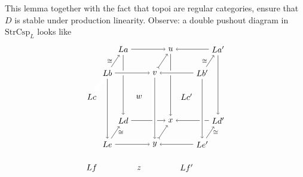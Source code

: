\documentclass{amsart}
\newcommand{\iso}{\cong}
\newcommand{\StrCsp}{\cat{StrCsp}}
\newcommand{\cat}[1]{\mathrm{#1}}
\theoremstyle{remark}
\theoremstyle{definition}
\begin{document}
This lemma together with the fact that topoi are regular
categories, ensure that $ D $ is stable under production linearity.
Observe: a double pushout diagram in $ \StrCsp_{L} $ looks like
%
\[
  \begin{tikzpicture}
    \node (1) at (1.33,5) {\( La \)};
    \node (2) at (3.33,5) {\( u \)};
    \node (3) at (5.33,5) {\( La' \)};
    \node (4) at (0.66,4) {\( Lb \)};
    \node (5) at (2.66,4) {\( v \)};
    \node (6) at (4.66,4) {\( Lb' \)};
    \node (7) at (0,3) {\( Lc \)};
    \node (8) at (2,3) {\( w \)};
    \node (9) at (4,3) {\( Lc' \)};
    \node (1') at (1.33,2) {\( Ld \)};
    \node (2') at (3.33,2) {\( x \)};
    \node (3') at (5.33,2) {\( Ld' \)};
    \node (4') at (0.66,1) {\( Le \)};
    \node (5') at (2.66,1) {\( y \)};
    \node (6') at (4.66,1) {\( Le' \)};
    \node (7') at (0,0) {\( Lf \)};
    \node (8') at (2,0) {\( z \)};
    \node (9') at (4,0) {\( Lf' \)};
    \draw [->] (1) to node [] {\scriptsize{\(  \)}} (2);
    \draw [->] (1') to node [] {\scriptsize{\(  \)}} (2');
    \draw [->] (3) to node [] {\scriptsize{\(  \)}} (2);
    \draw [->] (3') to node [] {\scriptsize{\(  \)}} (2');
    \draw [->] (1) to node [] {\scriptsize{\(  \)}} (1');
    \draw [->] (2) to node [] {\scriptsize{\(  \)}} (2');
    \draw [->] (3) to node [] {\scriptsize{\(  \)}} (3');
    \draw [->] (4) to node [left] {\scriptsize{\( \iso \)}} (1);
    \draw [->] (4') to node [right] {\scriptsize{\( \iso \)}} (1');
    \draw [>->] (5) to node [] {\scriptsize{\(  \)}} (2);
    \draw [>->] (5') to node [] {\scriptsize{\(  \)}} (2');
    \draw [->] (6) to node [left] {\scriptsize{\( \iso \)}} (3);
    \draw [->] (6') to node [right] {\scriptsize{\( \iso \)}} (3');
    \draw [white, line width=2mm] (4) -- (5);
    \draw [white, line width=2mm] (4') -- (5');
    \draw [white, line width=2mm] (6) -- (5);
    \draw [white, line width=2mm] (6') -- (5');
    \draw [white, line width=2mm] (4) -- (4');
    \draw [white, line width=2mm] (5) -- (5');
    \draw [white, line width=2mm] (6) -- (6');
    \draw [->] (4) to node [] {\scriptsize{\(  \)}} (5);
    \draw [->] (4') to node [] {\scriptsize{\(  \)}} (5');
    \draw [->] (6) to node [] {\scriptsize{\(  \)}} (5);
    \draw [->] (6') to node [] {\scriptsize{\(  \)}} (5');
    \draw [->] (4) to node [] {\scriptsize{\(  \)}} (4');
    \draw [->] (5) to node [] {\scriptsize{\(  \)}} (5');
    \draw [->] (6) to node [] {\scriptsize{\(  \)}} (6');
    \draw [white, line width=2mm] (4) -- (7);

\end{tikzpicture}\]
\end{document}
